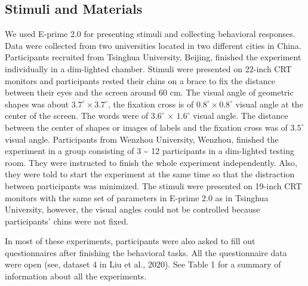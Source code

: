 \documentclass[
  man]{apa6}
\begin{document}
\hypertarget{stimuli-and-materials}{%
\subsection{Stimuli and Materials}\label{stimuli-and-materials}}

We used E-prime 2.0 for presenting stimuli and collecting behavioral responses. Data were collected from two universities located in two different cities in China. Participants recruited from Tsinghua University, Beijing, finished the experiment individually in a dim-lighted chamber. Stimuli were presented on 22-inch CRT monitors and participants rested their chins on a brace to fix the distance between their eyes and the screen around 60 cm. The visual angle of geometric shapes was about \(3.7^\circ × 3.7^\circ\), the fixation cross is of \(0.8^\circ × 0.8^\circ\) visual angle at the center of the screen. The words were of \(3.6^\circ\) × \(1.6^\circ\) visual angle. The distance between the center of shapes or images of labels and the fixation cross was of \(3.5^\circ\) visual angle. Participants from Wenzhou University, Wenzhou, finished the experiment in a group consisting of 3 \textasciitilde{} 12 participants in a dim-lighted testing room. They were instructed to finish the whole experiment independently. Also, they were told to start the experiment at the same time so that the distraction between participants was minimized. The stimuli were presented on 19-inch CRT monitors with the same set of parameters in E-prime 2.0 as in Tsinghua University, however, the visual angles could not be controlled because participants' chins were not fixed.

In most of these experiments, participants were also asked to fill out questionnaires after finishing the behavioral tasks. All the questionnaire data were open (see, dataset 4 in Liu et al., 2020). See Table 1 for a summary of information about all the experiments.
\end{document}
